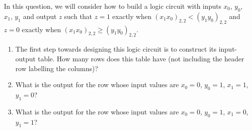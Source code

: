 
In this question, we will consider how
to build a logic circuit with inputs $x_0$, $y_0$, $x_1$, $y_1$
and output $z$ such that $z = 1$ exactly when $(x_1x_0)_{2,2} < (y_1y_0)_{2,2}$ 
and $z = 0$ exactly when $(x_1x_0)_{2,2} \geq (y_1y_0)_{2,2}$.

\begin{enumerate}
    \item The first step towards designing this logic circuit is to construct its input-output table.
    How many rows does this table have (not including the header row labelling the columns)?
    \item What is the output for the row whose input values are $x_0 = 0$, $y_0 = 1$, $x_1 = 1$, $y_1 = 0$?
    \item What is the output for the row whose input values are $x_0 = 0$, $y_0 = 1$, $x_1 = 0$, $y_1 = 1$?
\end{enumerate}
